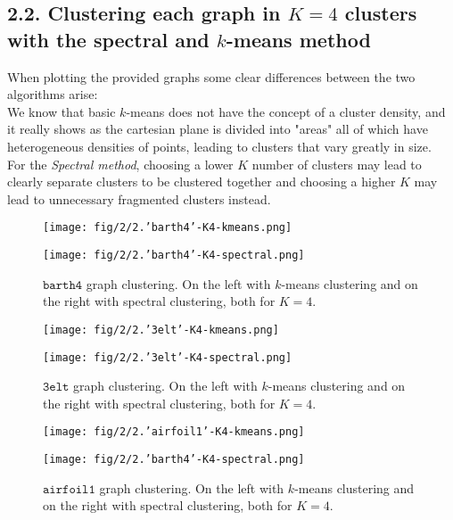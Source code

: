 \documentclass[unicode,11pt,a4paper,oneside,numbers=endperiod,openany]{scrartcl}
\begin{document}
\subsection*{2.2. Clustering each graph in $K=4$ clusters with the spectral and $k$-means method}
When plotting the provided graphs some clear differences between the two algorithms arise:\\
We know that basic $k$-means does not have the concept of a cluster density, and it really shows as the cartesian plane is divided into "areas" all of which have heterogeneous densities of points, leading to clusters that vary greatly in size.\\
For the \textit{Spectral method}, choosing a lower $K$ number of clusters may lead to clearly separate clusters to be clustered together and choosing a higher $K$ may lead to unnecessary fragmented clusters instead.
\begin{figure}[h!]
    \begin{minipage}{0.5\linewidth}
        \centering
        \texttt{[image: fig/2/2.'barth4'-K4-kmeans.png]}
    \end{minipage}
    \begin{minipage}{0.5\linewidth}
        \centering
        \texttt{[image: fig/2/2.'barth4'-K4-spectral.png]}
    \end{minipage}
    \caption{$\texttt {barth4}$ graph clustering. On the left with $k$-means clustering and on the right with spectral clustering, both for $K=4$.}
\end{figure}
\begin{figure}[h!]
    \begin{minipage}{0.5\linewidth}
        \centering
        \texttt{[image: fig/2/2.'3elt'-K4-kmeans.png]}
    \end{minipage}
    \begin{minipage}{0.5\linewidth}
        \centering
        \texttt{[image: fig/2/2.'3elt'-K4-spectral.png]}
    \end{minipage}
    \caption{$\texttt {3elt}$ graph clustering. On the left with $k$-means clustering and on the right with spectral clustering, both for $K=4$.}
\end{figure}
\begin{figure}[h!]
    \begin{minipage}{0.5\linewidth}
        \centering
        \texttt{[image: fig/2/2.'airfoil1'-K4-kmeans.png]}
    \end{minipage}
    \begin{minipage}{0.5\linewidth}
        \centering
        \texttt{[image: fig/2/2.'barth4'-K4-spectral.png]}
    \end{minipage}
    \caption{$\texttt {airfoil1}$ graph clustering. On the left with $k$-means clustering and on the right with spectral clustering, both for $K=4$.}
\end{figure}
\end{document}
